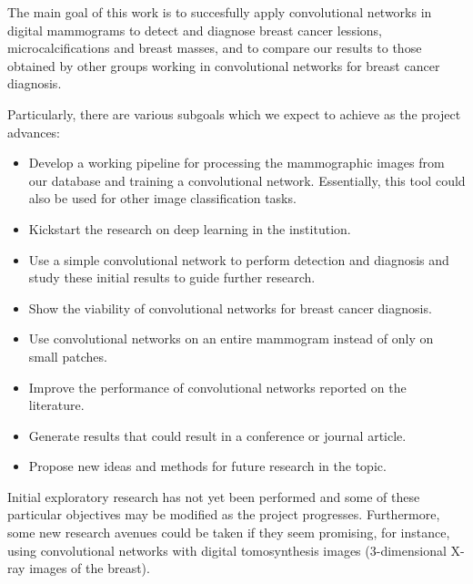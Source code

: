 The main goal of this work is to succesfully apply convolutional networks in digital mammograms to detect and diagnose breast cancer lessions, microcalcifications and breast masses, and to compare our results to those obtained by other groups working in convolutional networks for breast cancer diagnosis.

Particularly, there are various subgoals which we expect to achieve as the project advances:
\begin{itemize}
	\item Develop a working pipeline for processing the mammographic images from our database and training a convolutional network. Essentially, this tool could also be used for other image classification tasks.
	\item Kickstart the research on deep learning in the institution.
	\item Use a simple convolutional network to perform detection and diagnosis and study these initial results to guide further research.
	\item Show the viability of convolutional networks for breast cancer diagnosis.
	\item Use convolutional networks on an entire mammogram instead of only on small patches.
	\item Improve the performance of convolutional networks reported on the literature.
	\item Generate results that could result in a conference or journal article.
	\item Propose new ideas and methods for future research in the topic.
\end{itemize}
Initial exploratory research has not yet been performed and some of these particular objectives may be modified as the project progresses. Furthermore, some new research avenues could be taken if they seem promising, for instance, using convolutional networks with digital tomosynthesis images (3-dimensional X-ray images of the breast).


